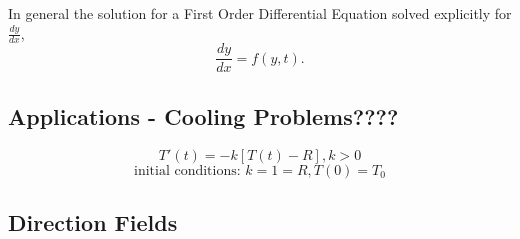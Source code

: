 \documentclass[10pt]{article}
\begin{document}
    In general the solution for a First Order Differential Equation solved explicitly for $\frac{dy}{dx}$, $$\frac{dy}{dx}=f(y,t).$$
    
    \subsection{Applications - Cooling Problems????}
    
    $$T'(t)=-k[T(t)-R], k>0$$
    $$\text{initial conditions:  } k=1=R, T(0)=T_0$$

    \newpage
    \subsection{Direction Fields}
    
\end{document}
